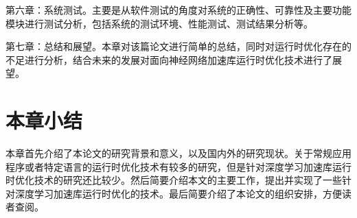 第六章：系统测试。主要是从软件测试的角度对系统的正确性、可靠性及主要功能模块进行测试分析，包括系统的测试环境、性能测试、测试结果分析等。

第七章：总结和展望。本章对该篇论文进行简单的总结，同时对运行时优化存在的不足进行分析，结合未来的发展对面向神经网络加速库运行时优化技术进行了展望。

\section {本章小结}

本章首先介绍了本论文的研究背景和意义，以及国内外的研究现状。关于常规应用程序或者特定语言的运行时优化技术有较多的研究，但是针对深度学习加速库运行时优化技术的研究还比较少。然后简要介绍本文的主要工作，提出并实现了一些针对深度学习加速库运行时优化的技术。最后简要介绍了本论文的组织安排，方便读者查阅。